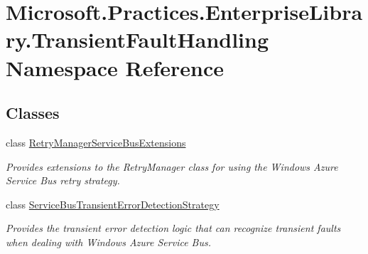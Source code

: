 \hypertarget{namespaceMicrosoft_1_1Practices_1_1EnterpriseLibrary_1_1TransientFaultHandling}{}\section{Microsoft.\+Practices.\+Enterprise\+Library.\+Transient\+Fault\+Handling Namespace Reference}
\label{namespaceMicrosoft_1_1Practices_1_1EnterpriseLibrary_1_1TransientFaultHandling}
\subsection*{Classes}
\begin{DoxyCompactItemize}
\item 
class \hyperlink{classMicrosoft_1_1Practices_1_1EnterpriseLibrary_1_1TransientFaultHandling_1_1RetryManagerServiceBusExtensions}{Retry\+Manager\+Service\+Bus\+Extensions}
\begin{DoxyCompactList}\small\item\em Provides extensions to the Retry\+Manager class for using the Windows Azure Service Bus retry strategy. \end{DoxyCompactList}\item 
class \hyperlink{classMicrosoft_1_1Practices_1_1EnterpriseLibrary_1_1TransientFaultHandling_1_1ServiceBusTransientErrorDetectionStrategy}{Service\+Bus\+Transient\+Error\+Detection\+Strategy}
\begin{DoxyCompactList}\small\item\em Provides the transient error detection logic that can recognize transient faults when dealing with Windows Azure Service Bus. \end{DoxyCompactList}\end{DoxyCompactItemize}
